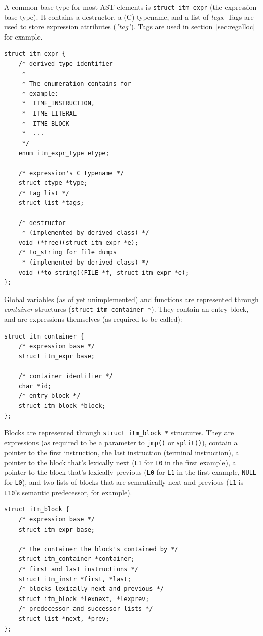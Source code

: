 \documentclass[12pt, a4paper]{article}
\begin{document}
A common base type for most AST elements is \verb+struct itm_expr+ (the
expression base type). It contains a destructor, a (C) typename, and a list of
\textit{tags}. Tags are used to store expression attributes (\textit{"tag"}).
Tags are used in section~\ref{sec:regalloc} for example.

\begin{lstlisting}
struct itm_expr {
	/* derived type identifier
	 *
	 * The enumeration contains for
	 * example:
	 *  ITME_INSTRUCTION,
	 *  ITME_LITERAL
	 *  ITME_BLOCK
	 *  ...
	 */
	enum itm_expr_type etype;

	/* expression's C typename */
	struct ctype *type;
	/* tag list */
	struct list *tags;

	/* destructor
	 * (implemented by derived class) */
	void (*free)(struct itm_expr *e);
	/* to_string for file dumps
	 * (implemented by derived class) */
	void (*to_string)(FILE *f, struct itm_expr *e);
};
\end{lstlisting}

Global variables (as of yet unimplemented) and functions are represented through
\textit{container} structures (\verb+struct itm_container *+). They contain an
entry block, and are expressions themselves (as required to be called):

\begin{lstlisting}
struct itm_container {
	/* expression base */
	struct itm_expr base;

	/* container identifier */
	char *id;
	/* entry block */
	struct itm_block *block;
};
\end{lstlisting}

Blocks are represented through \verb+struct itm_block *+ structures. They are
expressions (as required to be a parameter to \verb+jmp()+ or \verb+split()+),
contain a pointer to the first instruction, the last instruction (terminal
instruction), a pointer to the block that's lexically next (\verb+L1+ for
\verb+L0+ in the first example), a pointer to the block that's lexically previous
(\verb+L0+ for \verb+L1+ in the first example, \verb+NULL+ for \verb+L0+),
and two lists of blocks that are sementically next and previous (\verb+L1+ is
\verb+L10+'s semantic predecessor, for example).

\begin{lstlisting}
struct itm_block {
	/* expression base */
	struct itm_expr base;

	/* the container the block's contained by */
	struct itm_container *container;
	/* first and last instructions */
	struct itm_instr *first, *last;
	/* blocks lexically next and previous */
	struct itm_block *lexnext, *lexprev;
	/* predecessor and successor lists */
	struct list *next, *prev;
};
\end{lstlisting}
\end{document}
